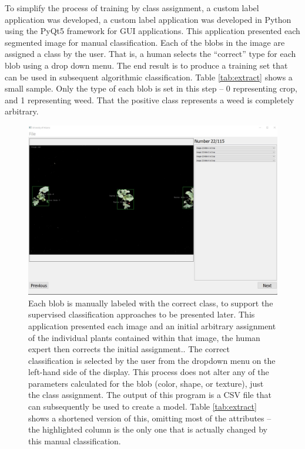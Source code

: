 \documentclass[letterpaper]{report}
\begin{document}
To simplify the process of training by class assignment, a custom label application was developed, a custom label application was developed in Python using the PyQt5 framework for GUI applications. This application presented each segmented image for manual classification. Each of the blobs in the image are assigned a class by the user. That is, a human selects the ``correct'' type for each blob using a drop down menu. The end result is to produce a training set that can be used in subsequent algorithmic classification. Table \ref{tab:extract} shows a small sample. Only the type of each blob is set in this step -- 0 representing crop, and 1 representing weed. That the positive class represents a weed is completely arbitrary.

\begin{figure}[H]
	\centering
	\includegraphics[scale=0.30]{./figures/review-application.jpg}
	\caption[Manual classification application screenshot]{Each blob is manually labeled with the correct class, to support the supervised classification approaches to be presented later. This application presented each image and an initial arbitrary assignment of the individual plants contained within that image, the human expert then corrects the initial assignment.. The correct classification is selected by the user from the dropdown menu on the left-hand side of the display. This process does not alter any of the parameters calculated for the blob (color, shape, or texture), just the class assignment. The output of this program is a CSV file that can subsequently be used to create a model. Table \ref{tab:extract} shows a shortened version of this, omitting most of the attributes -- the highlighted column is the only one that is actually changed by this manual classification.}
	\label{fig:review-application}
\end{figure}
\end{document}

